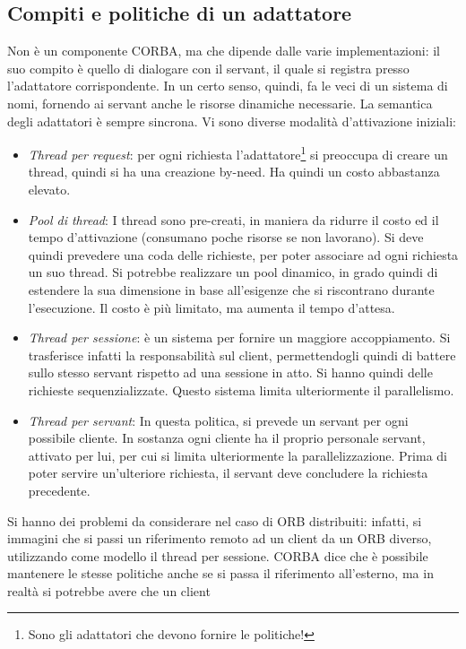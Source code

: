 \subsection{Compiti e politiche di un adattatore}
Non è un componente CORBA, ma che dipende dalle varie implementazioni: il suo compito è quello di dialogare con il
servant, il quale si registra presso l'adattatore corrispondente. In un certo senso, quindi, fa le veci di un sistema
di nomi, fornendo ai servant anche le risorse dinamiche necessarie.
La semantica degli adattatori è sempre sincrona. Vi sono diverse modalità d'attivazione iniziali:
\begin{itemize}
 \item \textit{Thread per request}: per ogni richiesta l'adattatore\footnote{Sono gli adattatori che devono fornire le
 politiche!} si preoccupa di creare un thread, quindi  si ha una creazione by-need. Ha quindi un costo abbastanza
 elevato.
 \item \textit{Pool di thread}: I thread sono pre-creati, in maniera da ridurre il costo ed il tempo d'attivazione (consumano poche
 risorse se non lavorano). Si deve quindi prevedere una coda delle richieste, per poter associare ad ogni richiesta un
 suo thread. Si potrebbe realizzare un pool dinamico, in grado quindi di estendere la sua dimensione in base
 all'esigenze che si riscontrano durante l'esecuzione. Il costo è più limitato, ma aumenta il tempo d'attesa.
 \item \textit{Thread per sessione}: è un sistema per fornire un maggiore accoppiamento. Si trasferisce infatti la
 responsabilità sul client, permettendogli quindi di battere sullo stesso servant rispetto ad una sessione in atto. Si hanno
 quindi delle richieste sequenzializzate. Questo sistema limita ulteriormente il parallelismo.
 \item \textit{Thread per servant}: In questa politica, si prevede un servant per ogni possibile cliente. In sostanza ogni cliente ha il proprio personale servant, attivato per lui, per cui si limita
 ulteriormente la parallelizzazione. Prima di poter servire un'ulteriore richiesta, il servant deve concludere la
 richiesta precedente.
\end{itemize}
Si hanno dei problemi da considerare nel caso di ORB distribuiti: infatti, si immagini che si passi un riferimento
remoto ad un client da un ORB diverso, utilizzando come modello il thread per sessione. CORBA dice che è possibile
mantenere le stesse politiche anche se si passa il riferimento all'esterno, ma in realtà si potrebbe avere che un client
